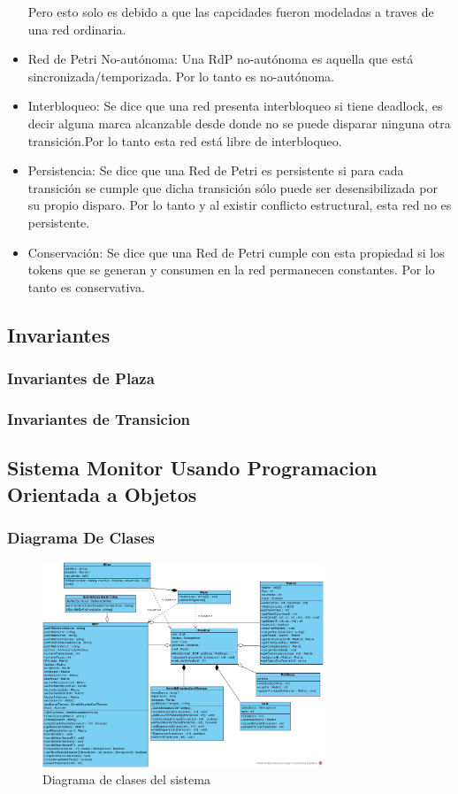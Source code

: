 \documentclass{article}
\begin{document}
\begin{itemize}
		Pero esto solo es debido a que las capcidades fueron modeladas a traves de una red ordinaria.
		\item Red de Petri No-autónoma: Una RdP no-autónoma es aquella que está 
		sincronizada/temporizada. Por lo tanto es no-autónoma.
		\item Interbloqueo: Se dice que una red presenta interbloqueo si tiene deadlock, 
		es decir alguna marca alcanzable desde donde no se puede disparar ninguna otra 
		transición.Por lo tanto esta red está libre de interbloqueo.
		\item Persistencia: Se dice que una Red de Petri es persistente si para cada 
		transición se cumple que dicha transición sólo puede ser desensibilizada por 
		su propio disparo. Por lo tanto y al existir conflicto estructural, esta red 
		no es persistente.
		\item Conservación: Se dice que una Red de Petri cumple con esta propiedad si 
		los tokens que se generan y consumen en la red permanecen constantes. Por lo 
		tanto es conservativa.
	\end{itemize}
	\subsection{Invariantes}
		\subsubsection{Invariantes de Plaza}
		\subsubsection{Invariantes de Transicion}
	\subsection{Sistema Monitor Usando Programacion Orientada a Objetos}
		\subsubsection{Diagrama De Clases}
		\begin{figure}[h]
			\centering
			\includegraphics[width=0.75\textwidth]{Diagrama_de_Clase}
			\caption{Diagrama de clases del sistema}
			\label{fig:mesh2}
		\end{figure}
\end{document}
